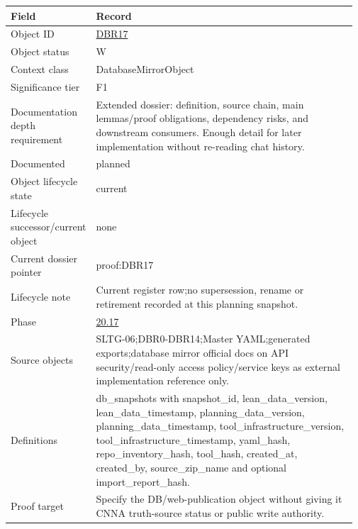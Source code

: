 \begin{longtable}{L{0.16\linewidth} L{0.81\linewidth}}
\hline
\textbf{Field} & \textbf{Record}\\
\hline
Object ID & \hyperlink{object-row-DBR17}{DBR17}\\
\hline\addlinespace[0.20em]
Object status & W\\
\hline\addlinespace[0.20em]
Context class & DatabaseMirrorObject\\
\hline\addlinespace[0.20em]
Significance tier & F1\\
\hline\addlinespace[0.20em]
Documentation depth requirement & Extended dossier: definition, source chain, main lemmas/\allowbreak{}proof obligations, dependency risks, and downstream consumers. Enough detail for later implementation without re-reading chat history.\\
\hline\addlinespace[0.20em]
Documented & planned\\
\hline\addlinespace[0.20em]
Object lifecycle state & current\\
\hline\addlinespace[0.20em]
Lifecycle successor/\allowbreak{}current object & none\\
\hline\addlinespace[0.20em]
Current dossier pointer & proof:DBR17\\
\hline\addlinespace[0.20em]
Lifecycle note & Current register row;\newline no supersession, rename or retirement recorded at this planning snapshot.\\
\hline\addlinespace[0.20em]
Phase & \hyperlink{phase-row-20-17}{20.17}\\
\hline\addlinespace[0.20em]
Source objects & SLTG-06;\newline DBR0-DBR14;\newline Master YAML;\newline generated exports;\newline database mirror official docs on API security/\allowbreak{}read-only access policy/\allowbreak{}service keys as external implementation reference only.\\
\hline\addlinespace[0.20em]
Definitions & db\_snapshots with snapshot\_id, lean\_data\_version, lean\_data\_timestamp, planning\_data\_version, planning\_data\_timestamp, tool\_infrastructure\_version, tool\_infrastructure\_timestamp, yaml\_hash, repo\_inventory\_hash, tool\_hash, created\_at, created\_by, source\_zip\_name and optional import\_report\_hash.\\
\hline\addlinespace[0.20em]
Proof target & Specify the DB/\allowbreak{}web-publication object without giving it CNNA truth-source status or public write authority.\\

\end{longtable}
